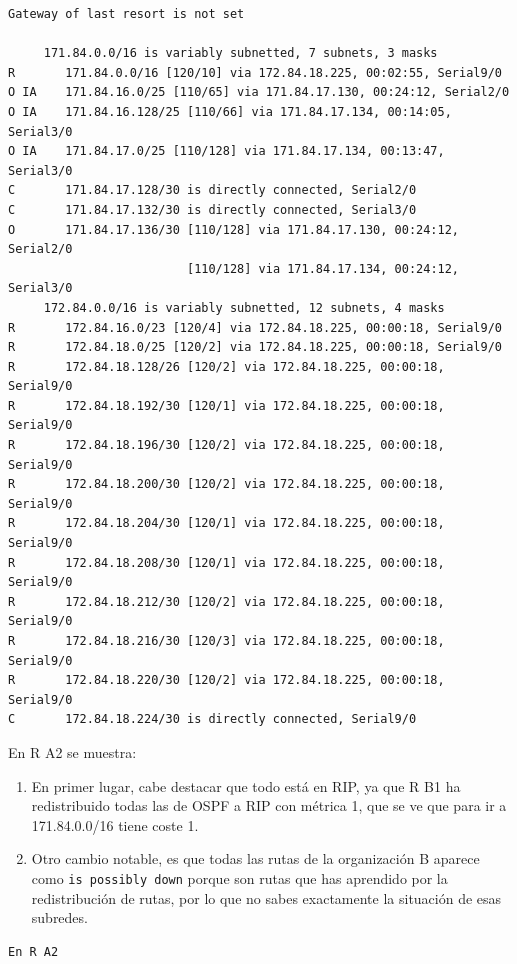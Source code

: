 \documentclass[11pt]{article}
\begin{document}
\begin{enumerate}
\begin{mdframed}
\begin{verbatim}
Gateway of last resort is not set

     171.84.0.0/16 is variably subnetted, 7 subnets, 3 masks
R       171.84.0.0/16 [120/10] via 172.84.18.225, 00:02:55, Serial9/0
O IA    171.84.16.0/25 [110/65] via 171.84.17.130, 00:24:12, Serial2/0
O IA    171.84.16.128/25 [110/66] via 171.84.17.134, 00:14:05, Serial3/0
O IA    171.84.17.0/25 [110/128] via 171.84.17.134, 00:13:47, Serial3/0
C       171.84.17.128/30 is directly connected, Serial2/0
C       171.84.17.132/30 is directly connected, Serial3/0
O       171.84.17.136/30 [110/128] via 171.84.17.130, 00:24:12, Serial2/0
                         [110/128] via 171.84.17.134, 00:24:12, Serial3/0
     172.84.0.0/16 is variably subnetted, 12 subnets, 4 masks
R       172.84.16.0/23 [120/4] via 172.84.18.225, 00:00:18, Serial9/0
R       172.84.18.0/25 [120/2] via 172.84.18.225, 00:00:18, Serial9/0
R       172.84.18.128/26 [120/2] via 172.84.18.225, 00:00:18, Serial9/0
R       172.84.18.192/30 [120/1] via 172.84.18.225, 00:00:18, Serial9/0
R       172.84.18.196/30 [120/2] via 172.84.18.225, 00:00:18, Serial9/0
R       172.84.18.200/30 [120/2] via 172.84.18.225, 00:00:18, Serial9/0
R       172.84.18.204/30 [120/1] via 172.84.18.225, 00:00:18, Serial9/0
R       172.84.18.208/30 [120/1] via 172.84.18.225, 00:00:18, Serial9/0
R       172.84.18.212/30 [120/2] via 172.84.18.225, 00:00:18, Serial9/0
R       172.84.18.216/30 [120/3] via 172.84.18.225, 00:00:18, Serial9/0
R       172.84.18.220/30 [120/2] via 172.84.18.225, 00:00:18, Serial9/0
C       172.84.18.224/30 is directly connected, Serial9/0
\end{verbatim}
\end{mdframed}

En R A2 se muestra:

\begin{enumerate}
    \item En primer lugar, cabe destacar que todo está en RIP, ya que R B1 ha redistribuido todas las de OSPF a RIP con métrica 1, que se ve que para ir a 171.84.0.0/16 tiene coste 1.
    \item Otro cambio notable, es que todas las rutas de la organización B aparece como \texttt{is possibly down} porque son rutas que has aprendido por la redistribución de rutas, por lo que no sabes exactamente la situación de esas subredes. 
\end{enumerate}

\begin{mdframed}
\begin{verbatim}
En R A2


\end{verbatim}
\end{mdframed}
\end{enumerate}
\end{document}
